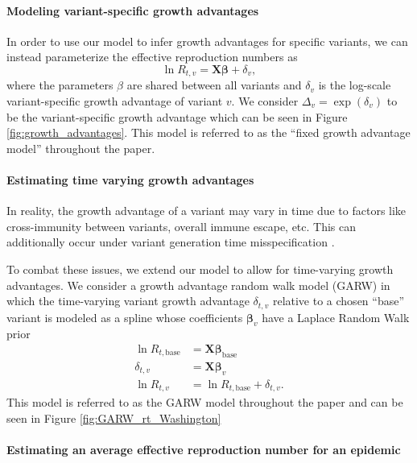 \documentclass[11pt,oneside,letterpaper]{article}
\renewcommand{\vec}[1]{\boldsymbol{#1}}
\begin{document}
\paragraph{Modeling variant-specific growth advantages}%

In order to use our model to infer growth advantages for specific variants, we can instead parameterize the effective reproduction numbers as
\begin{equation}
\ln R_{t,v} = \vec{X} \vec{\beta} + \delta_{v},
\end{equation}
where the parameters $\beta$ are shared between all variants and $\delta_{v}$ is the log-scale variant-specific growth advantage of variant $v$.
We consider $\Delta_{v} = \exp(\delta_{v})$ to be the variant-specific growth advantage which can be seen in Figure \ref{fig:growth_advantages}.
This model is referred to as the ``fixed growth advantage model'' throughout the paper.

\paragraph{Estimating time varying growth advantages}
In reality, the growth advantage of a variant may vary in time due to factors like cross-immunity between variants, overall immune escape, etc.
This can additionally occur under variant generation time misspecification \cite{Park2021.05.03.21256545}.

To combat these issues, we extend our model to allow for time-varying growth advantages.
We consider a growth advantage random walk model (GARW) in which the time-varying variant growth advantage $\delta_{t,v}$ relative to a chosen ``base'' variant is modeled as a spline whose coefficients $\vec{\beta}_{v}$ have a Laplace Random Walk prior
\begin{align*}
  \ln R_{t, \text{base}} &= \vec{X} \vec{\beta}_{\text{base}}\\
  \delta_{t, v} &= \vec{X} \vec{\beta}_{v}\\
  \ln R_{t, v} &= \ln R_{t, \text{base}} + \delta_{t, v}.
\end{align*}
This model is referred to as the GARW model throughout the paper and can be seen in Figure \ref{fig:GARW_rt_Washington}

\paragraph{Estimating an average effective reproduction number for an epidemic}
\end{document}
